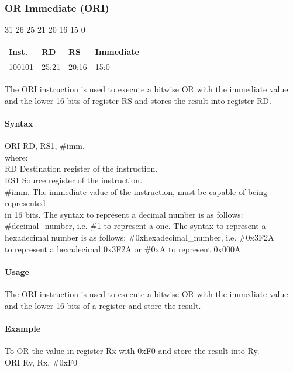 \documentclass[12pt]{article}
\newcommand{\iTypeInstruction}[6]
{%
    \hspace{1.6cm}31 \hspace{1.15cm}26 \hspace{.05cm}25 \hspace{.8cm}21 \hspace{.05cm}20 \hspace{.8cm}16 \hspace{.05cm}15 \hspace{6.4cm}0
    \vspace{-.25cm}
    \begin{center}
        \begin{tabular}{ |p{1.8cm}|p{1.5cm}|p{1.5cm}|p{6.8cm}| }
            \hline
            \textbf{Inst.} & \textbf{RD} &  \textbf{RS} & \textbf{Immediate}\\
            \hline
            #1 & 25:21 & 20:16 &15:0\\
            \hline
        \end{tabular}
    \end{center}
    
    \noindent
    #2
    
    \paragraph{Syntax}
    \begin{flushleft}
    #3 RD, RS1, \#imm.\\
    \vspace{1em}        %
    where:\\
    \vspace{1em}
    RD  \hspace{3.6em} Destination register of the instruction.\\
    \vspace{1em}
    RS1  \hspace{3.35em} Source register of the instruction.\\
    \vspace{1em}
    \#imm.  \hspace{1.8em} The immediate value of the instruction, must be capable of being represented\\             \hspace{5.4em} in 16 bits. The syntax to represent a decimal number is as follows:\\
            \hspace{5.4em} \#decimal\_number, i.e. \#1 to represent a one. The syntax to represent a\\
            \hspace{5.4em} hexadecimal number is as follows: \#0xhexadecimal\_number, i.e. \#0x3F2A \\
            \hspace{5.4em} to represent a hexadecimal 0x3F2A or \#0xA to represent 0x000A.\\
    \end{flushleft}
    
    \paragraph{Usage}
    \begin{flushleft}
    #4\\
    \end{flushleft}
    \paragraph{Example}
    \begin{flushleft}
    #5\\
    \vspace{1em}
    #6
    \end{flushleft}}
\begin{document}

    \newpage
    \subsubsection{OR Immediate (ORI)}
    
    \iTypeInstruction
    {100101}
    {The ORI instruction is used to execute a bitwise OR with the immediate value and the lower 16 bits of register RS and stores the result into register RD.}
    {ORI}
    {The ORI instruction is used to execute a bitwise OR with the immediate value and the lower 16 bits of a register and store the result.}
    {To OR the value in register Rx with 0xF0 and store the result into Ry.}
    {ORI Ry, Rx, \#0xF0}
    
    
    
\end{document}

